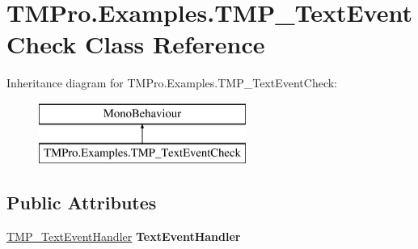 \hypertarget{class_t_m_pro_1_1_examples_1_1_t_m_p___text_event_check}{}\section{T\+M\+Pro.\+Examples.\+T\+M\+P\+\_\+\+Text\+Event\+Check Class Reference}
\label{class_t_m_pro_1_1_examples_1_1_t_m_p___text_event_check}
Inheritance diagram for T\+M\+Pro.\+Examples.\+T\+M\+P\+\_\+\+Text\+Event\+Check\+:\begin{figure}[H]
\begin{center}
\leavevmode
\includegraphics[height=2.000000cm]{class_t_m_pro_1_1_examples_1_1_t_m_p___text_event_check}
\end{center}
\end{figure}
\subsection*{Public Attributes}
\begin{DoxyCompactItemize}
\item 
\mbox{\label{class_t_m_pro_1_1_examples_1_1_t_m_p___text_event_check_ae23cb7bfed7c19448af70d9e7de12c95}} 
\hyperlink{class_t_m_pro_1_1_t_m_p___text_event_handler}{T\+M\+P\+\_\+\+Text\+Event\+Handler} {\bfseries Text\+Event\+Handler}
\end{DoxyCompactItemize}

